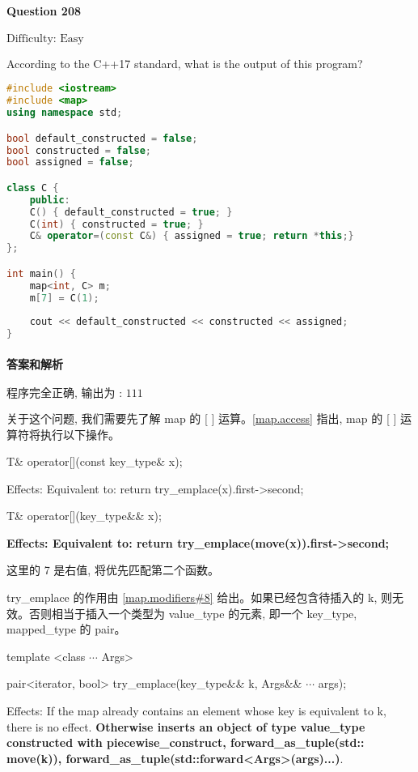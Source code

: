 \documentclass{article}
\begin{document}
	
	\paragraph*{Question 208} $\boxed{\text{Difficulty: Easy}} $			
	
	According to the C++17 standard, what is the output of this program?
	
	\begin{lstlisting}[language=C++]  		
#include <iostream>
#include <map>
using namespace std;

bool default_constructed = false;
bool constructed = false;
bool assigned = false;

class C {
	public:
	C() { default_constructed = true; }
	C(int) { constructed = true; }
	C& operator=(const C&) { assigned = true; return *this;}
};

int main() {
	map<int, C> m;
	m[7] = C(1);
	
	cout << default_constructed << constructed << assigned;
}
	\end{lstlisting}
	
	
	\paragraph*{答案和解析} $\boxed{\text{程序完全正确, 输出为 : 111}} $
	
	关于这个问题, 我们需要先了解 map 的 [ ] 运算。\href{https://timsong-cpp.github.io/cppwp/n4659/map.access}{[map.access]} 指出, map 的 [ ] 运算符将执行以下操作。
	
	\begin{lightgrayleftbar}
	T\& operator[](const key\_type\& x);
	
	Effects: Equivalent to: return try\_­emplace(x).first->second;
	
	T\& operator[](key\_type\&\& x);
	
	\textbf{Effects: Equivalent to: return try\_­emplace(move(x)).first->second; }
	\end{lightgrayleftbar}
	
	这里的 7 是右值, 将优先匹配第二个函数。
	
	try\_emplace 的作用由 \href{https://timsong-cpp.github.io/cppwp/n4659/map.modifiers#8}{[map.modifiers\#8]} 给出。如果已经包含待插入的 k, 则无效。否则相当于插入一个类型为 value\_type 的元素, 即一个 key\_type, mapped\_type 的 pair。
	
	\begin{lightgrayleftbar}
		template <class $\cdots$ Args>
		
		pair<iterator, bool> try\_emplace(key\_type\&\& k, Args\&\& $\cdots$ args);
		
		Effects: If the map already contains an element whose key is equivalent to k, there is no effect. \textbf{Otherwise inserts an object of type value\_­type constructed with piecewise\_­construct, forward\_­as\_­tuple(std​::​move(k)), forward\_­as\_­tuple(std​::​forward<Args>(args)...)}.
	\end{lightgrayleftbar}
\end{document}
